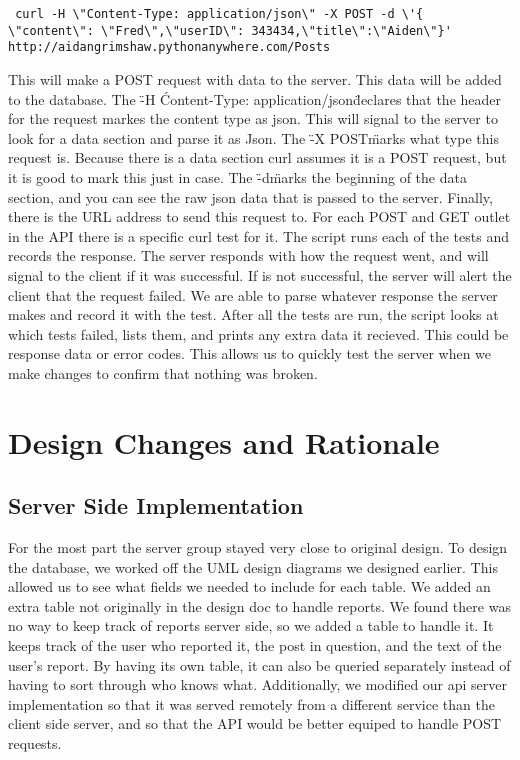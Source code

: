 \documentclass[12pt]{article}
\begin{document}
\begin{verbatim} curl -H \"Content-Type: application/json\" -X POST -d \'{
\"content\": \"Fred\",\"userID\": 343434,\"title\":\"Aiden\"}'
http://aidangrimshaw.pythonanywhere.com/Posts \end{verbatim}

This will make a POST request with data to the server.  This data will be added
to the database.  The \"-H \'Content-Type: application/json\" declares that the
header for the request markes the content type as json.  This will signal to the
server to look for a data section and parse it as Json.  The \"-X POST\" marks
what type this request is.  Because there is a data section curl assumes it is a
POST request, but it is good to mark this just in case.  The \"-d\" marks the
beginning of the data section, and you can see the raw json data that is passed
to the server.  Finally, there is the URL address to send this request to.  For
each POST and GET outlet in the API there is a specific curl test for it.  The
script runs each of the tests and records the response.  The server responds
with how the request went, and will signal to the client if it was successful.
If is not successful, the server will alert the client that the request failed.
We are able to parse whatever response the server makes and record it with the
test.  After all the tests are run, the script looks at which tests failed,
lists them, and prints any extra data it recieved.  This could be response data
or error codes.  This allows us to quickly test the server when we make changes
to confirm that nothing was broken.

\section{Design Changes and Rationale}
\subsection{Server Side Implementation}
For the most part the server group stayed very close to original design.  To
design the database, we worked off the UML design diagrams we designed earlier.
This allowed us to see what fields we needed to include for each table.  We
added an extra table not originally in the design doc to handle reports.  We
found there was no way to keep track of reports server side, so we added a table
to handle it.  It keeps track of the user who reported it, the post in question,
and the text of the user’s report.  By having its own table, it can also be
queried separately instead of having to sort through who knows what.
Additionally, we modified our api server implementation so that it was served
remotely from a different service than the client side server, and so that the
API would be better equiped to handle POST requests.
\end{document}
